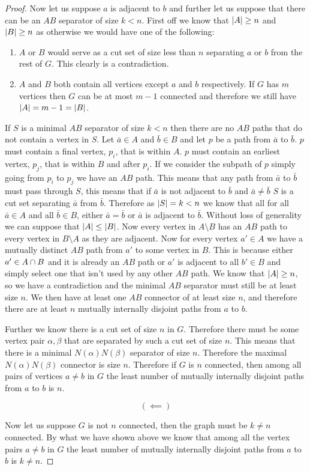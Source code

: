 \documentclass{article}
\begin{document}
\begin{proof}
	Now let us suppose $a$ is adjacent to $b$ and further let us suppose that there can be an $AB$ separator of size $k < n$. First off we know that $\left| {A} \right| \ge n$ and $\left| {B} \right| \ge n$ as otherwise we would have one of the following:
	\begin{enumerate}
		\item $A$ or $B$ would serve as a cut set of size less than $n$ separating $a$ or $b$ from the rest of $G$. This clearly is a contradiction.
		\item $A$ and $B$ both contain all vertices except $a$ and $b$ respectively. If $G$ has $m$ vertices then $G$ can be at most $m-1$ connected and therefore we still have $\left| {A} \right| = m-1 = \left| {B} \right|$.
	\end{enumerate}
	If $S$ is a minimal $AB$ separator of size $k < n$ then there are no $AB$ paths that do not contain a vertex in $S$. Let $\bar a\in A$ and $\bar b \in B$ and let $p$ be a path from $\bar a$ to $\bar b$. $p$ must contain a final vertex, $p_i$, that is within $A$. $p$ must contain an earliest vertex, $p_j$, that is within $B$ and after $p_i$. If we consider the subpath of $p$ simply going from $p_i$ to $p_j$ we have an $AB$ path. This means that any path from $\bar a$ to $\bar b$ must pass through $S$, this means that if $\bar a$ is not adjacent to $\bar b$ and $\bar a\not=\bar b$ $S$ is a cut set separating $\bar a$ from $\bar b$. Therefore as $\left| {S} \right| = k < n$ we know that all for all $\bar a \in A$ and all $\bar b\in B$, either $\bar a= \bar b$ or $\bar a$ is adjacent to $\bar b$. Without loss of generality we can suppose that $\left| {A} \right| \le \left| {B} \right|$. Now every vertex in $A\setminus B$ has an $AB$ path to every vertex in $B \setminus A$ as they are adjacent. Now for every vertex $a'\in A$ we have a mutually distinct $AB$ path from $a'$ to some vertex in $B$. This is because either $a'\in A\cap B$ and it is already an $AB$ path or $a'$ is adjacent to all $b' \in B$ and simply select one that isn't used by any other $AB$ path. We know that $\left| {A} \right| \ge n$, so we have a contradiction and the minimal $AB$ separator must still be at least size $n$. We then have at least one $AB$ connector of at least size $n$, and therefore there are at least $n$ mutually internally disjoint paths from $a$ to $b$.
	
	Further we know there is a cut set of size $n$ in $G$. Therefore there must be some vertex pair $\alpha, \beta$ that are separated by such a cut set of size $n$. This means that there is a minimal $N(\alpha)N(\beta)$ separator of size $n$. Therefore the maximal $N(\alpha)N(\beta)$ connector is size $n$. Therefore if $G$ is $n$ connected, then among all pairs of vertices $a\not=b$ in $G$ the least number of mutually internally disjoint paths from $a$ to $b$ is $n$.
	
	$$(\impliedby)$$
	
	Now let us suppose $G$ is not $n$ connected, then the graph must be $k\not= n$ connected. By what we have shown above we know that among all the vertex pairs $a\not= b$ in $G$ the least number of mutually internally disjoint paths from $a$ to $b$ is $k\not=n$.
\end{proof}
\end{document}

